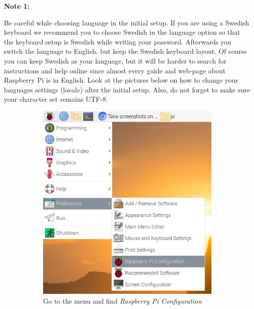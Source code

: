 \documentclass{article}
\begin{document}
{\bf Note 1: }\parbox[t]{14cm}{Be careful while choosing language in the initial setup. If you are using a Swedish keyboard we recommend you to choose Swedish in the language option so that the keyboard setup is Swedish while writing your password. Afterwards you switch the language to English, but keep the Swedish keyboard layout. Of course you can keep Swedish as your language, but it will be harder to search for instructions and help online since almost every guide and web-page about Raspberry Pi is in English. Look at the pictures below on how to change your languages settings (locale) after the initial setup. Also, do not forget to make sure your character set remains UTF-8.}
\begin{figure}[h]
    \centering
    \begin{subfigure}[t]{0.49\textwidth}
        \centering
        \includegraphics[width=\textwidth]{menu.png}
        \caption{Go to the menu and find \emph{Raspberry Pi Configuration}}
    \end{subfigure}
    \begin{subfigure}[t]{0.49\textwidth}
        \centering

\end{subfigure}
\end{figure}
\end{document}
